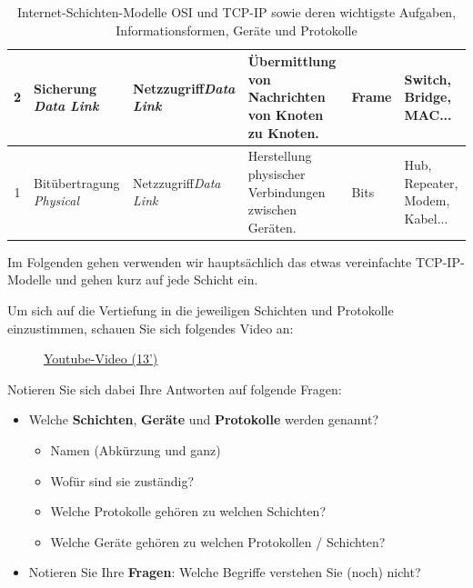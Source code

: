 \begin{table}[H]
\begin{tabular}{c|m{2.6cm}||m{2cm}||m{4.6cm}|m{2.5cm}|m{2cm}}
		\rowcolor{Gray!15}2      & Sicherung \newline \textit{Data Link}      & Netzzugriff\newline\textit{Data Link} & Übermittlung von Nachrichten von Knoten zu Knoten.                                                              & Frame                                     & Switch, Bridge, \textbf{MAC}...       \\\midrule
		\rowcolor{Gray!25}1      & Bitübertragung \newline \textit{Physical}  & Netzzugriff\newline\textit{Data Link} & Herstellung physischer Verbindungen zwischen Geräten.                                                           & Bits                                      & Hub, Repeater, Modem, Kabel...        \\
	\end{tabular}
	\label{table:osi-layers}
	\caption{Internet-Schichten-Modelle \gls{OSI} und \gls{TCP}-\gls{IP} sowie deren wichtigste Aufgaben, Informationsformen, Geräte und Protokolle}
\end{table}

Im Folgenden gehen verwenden wir hauptsächlich das etwas vereinfachte \acrfull{TCP}-\acrfull{IP}-Modelle und gehen kurz auf jede Schicht ein.



\begin{myexercise}
	Um sich auf die Vertiefung in die jeweiligen Schichten und Protokolle einzustimmen, schauen Sie sich folgendes Video an:

	\begin{figure}[H]
		\href{https://www.youtube.com/watch?v=PBWhzz_Gn10}{Youtube-Video (13')}
	\end{figure}

	Notieren Sie sich dabei Ihre Antworten auf folgende Fragen:
	\begin{itemize}
		\item Welche \textbf{Schichten}, \textbf{Geräte} und \textbf{Protokolle} werden genannt?
		      \begin{itemize}
			      \item Namen (Abkürzung und ganz)
			      \item Wofür sind sie zuständig?
			      \item Welche Protokolle gehören zu welchen Schichten?
			      \item Welche Geräte gehören zu welchen Protokollen / Schichten?
		      \end{itemize}
		\item Notieren Sie Ihre \textbf{Fragen}: Welche Begriffe verstehen Sie (noch) nicht?
	\end{itemize}

\end{myexercise}

